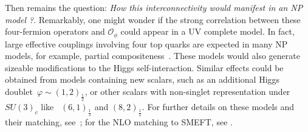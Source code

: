 	Then remains the question: \textit{How this interconnectivity would manifest in an NP model ?}. Remarkably, one might wonder if the strong correlation between these four-fermion operators and $\mathcal{O}_\phi$ could appear in a UV complete model. In fact, large effective couplings involving four top quarks are expected in many NP models, for example, partial compositeness~\cite{Banelli:2020iau}. These models would also generate sizeable modifications to the Higgs self-interaction. Similar effects could be obtained from models containing new scalars, such as an additional Higgs doublet~$\varphi\sim (1,2)_{\frac 12}$, or other scalars with non-singlet representation under $SU(3)_c$ like~ $(6,1)_{\frac 1 3}$ and $(8,2)_{\frac 1 2}$. For further details on these models and their matching, see~\cite{deBlas:2017xtg}; for the NLO matching to SMEFT, see \cite{Anisha:2021hgc}. 
